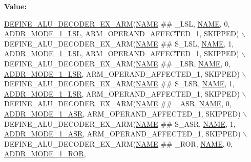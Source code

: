 {\bfseries Value\+:}
\begin{DoxyCode}
\mbox{\hyperlink{decoder-arm_8c_a9f65c06daece247752b5fd0285e475f3}{DEFINE\_ALU\_DECODER\_EX\_ARM}}(\mbox{\hyperlink{inflate_8h_a164ea0159d5f0b5f12a646f25f99eceaa67bc2ced260a8e43805d2480a785d312}{NAME}} ## \_LSL, \mbox{\hyperlink{inflate_8h_a164ea0159d5f0b5f12a646f25f99eceaa67bc2ced260a8e43805d2480a785d312}{NAME}}, 0, 
      \mbox{\hyperlink{decoder-arm_8c_af7ffdff1f9a8ce3e5f5f534567ce62c7}{ADDR\_MODE\_1\_LSL}}, ARM\_OPERAND\_AFFECTED\_1, SKIPPED) \(\backslash\)
    DEFINE\_ALU\_DECODER\_EX\_ARM(\mbox{\hyperlink{inflate_8h_a164ea0159d5f0b5f12a646f25f99eceaa67bc2ced260a8e43805d2480a785d312}{NAME}} ## S\_LSL, \mbox{\hyperlink{inflate_8h_a164ea0159d5f0b5f12a646f25f99eceaa67bc2ced260a8e43805d2480a785d312}{NAME}}, 1, \mbox{\hyperlink{decoder-arm_8c_af7ffdff1f9a8ce3e5f5f534567ce62c7}{ADDR\_MODE\_1\_LSL}}, 
      ARM\_OPERAND\_AFFECTED\_1, SKIPPED) \(\backslash\)
    DEFINE\_ALU\_DECODER\_EX\_ARM(\mbox{\hyperlink{inflate_8h_a164ea0159d5f0b5f12a646f25f99eceaa67bc2ced260a8e43805d2480a785d312}{NAME}} ## \_LSR, \mbox{\hyperlink{inflate_8h_a164ea0159d5f0b5f12a646f25f99eceaa67bc2ced260a8e43805d2480a785d312}{NAME}}, 0, \mbox{\hyperlink{decoder-arm_8c_af7d17794392b03e822fe37dc28142356}{ADDR\_MODE\_1\_LSR}}, 
      ARM\_OPERAND\_AFFECTED\_1, SKIPPED) \(\backslash\)
    DEFINE\_ALU\_DECODER\_EX\_ARM(\mbox{\hyperlink{inflate_8h_a164ea0159d5f0b5f12a646f25f99eceaa67bc2ced260a8e43805d2480a785d312}{NAME}} ## S\_LSR, \mbox{\hyperlink{inflate_8h_a164ea0159d5f0b5f12a646f25f99eceaa67bc2ced260a8e43805d2480a785d312}{NAME}}, 1, \mbox{\hyperlink{decoder-arm_8c_af7d17794392b03e822fe37dc28142356}{ADDR\_MODE\_1\_LSR}}, 
      ARM\_OPERAND\_AFFECTED\_1, SKIPPED) \(\backslash\)
    DEFINE\_ALU\_DECODER\_EX\_ARM(\mbox{\hyperlink{inflate_8h_a164ea0159d5f0b5f12a646f25f99eceaa67bc2ced260a8e43805d2480a785d312}{NAME}} ## \_ASR, \mbox{\hyperlink{inflate_8h_a164ea0159d5f0b5f12a646f25f99eceaa67bc2ced260a8e43805d2480a785d312}{NAME}}, 0, \mbox{\hyperlink{decoder-arm_8c_a0597e090d6870596c4c41dedeb4c0835}{ADDR\_MODE\_1\_ASR}}, 
      ARM\_OPERAND\_AFFECTED\_1, SKIPPED) \(\backslash\)
    DEFINE\_ALU\_DECODER\_EX\_ARM(\mbox{\hyperlink{inflate_8h_a164ea0159d5f0b5f12a646f25f99eceaa67bc2ced260a8e43805d2480a785d312}{NAME}} ## S\_ASR, \mbox{\hyperlink{inflate_8h_a164ea0159d5f0b5f12a646f25f99eceaa67bc2ced260a8e43805d2480a785d312}{NAME}}, 1, \mbox{\hyperlink{decoder-arm_8c_a0597e090d6870596c4c41dedeb4c0835}{ADDR\_MODE\_1\_ASR}}, 
      ARM\_OPERAND\_AFFECTED\_1, SKIPPED) \(\backslash\)
    DEFINE\_ALU\_DECODER\_EX\_ARM(\mbox{\hyperlink{inflate_8h_a164ea0159d5f0b5f12a646f25f99eceaa67bc2ced260a8e43805d2480a785d312}{NAME}} ## \_ROR, \mbox{\hyperlink{inflate_8h_a164ea0159d5f0b5f12a646f25f99eceaa67bc2ced260a8e43805d2480a785d312}{NAME}}, 0, \mbox{\hyperlink{decoder-arm_8c_a52afd307d8b50469ab0811de861100c7}{ADDR\_MODE\_1\_ROR}}, 

\end{DoxyCode}
